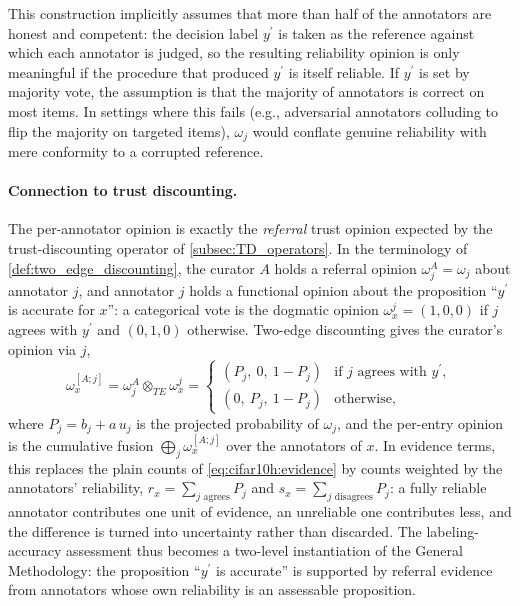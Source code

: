 This construction implicitly assumes that more than half of the annotators are honest and competent: the decision label $y^\prime$ is taken as the reference against which each annotator is judged, so the resulting reliability opinion is only meaningful if the procedure that produced $y^\prime$ is itself reliable. If $y^\prime$ is set by majority vote, the assumption is that the majority of annotators is correct on most items. In settings where this fails (e.g., adversarial annotators colluding to flip the majority on targeted items), $\omega_j$ would conflate genuine reliability with mere conformity to a corrupted reference.

\paragraph{Connection to trust discounting.}
The per-annotator opinion is exactly the \emph{referral} trust opinion expected by the trust-discounting operator of \cref{subsec:TD_operators}. In the terminology of \cref{def:two_edge_discounting}, the curator $A$ holds a referral opinion $\omega^A_j = \omega_j$ about annotator $j$, and annotator $j$ holds a functional opinion about the proposition ``$y^\prime$ is accurate for $x$'': a categorical vote is the dogmatic opinion $\omega^j_x = (1, 0, 0)$ if $j$ agrees with $y^\prime$ and $(0, 1, 0)$ otherwise. Two-edge discounting gives the curator's opinion via $j$,
\[
\omega^{[A;j]}_x = \omega^A_j \otimes_{TE} \omega^j_x =
\begin{cases}
(P_j,\ 0,\ 1 - P_j) & \text{if } j \text{ agrees with } y^\prime,\\
(0,\ P_j,\ 1 - P_j) & \text{otherwise},
\end{cases}
\]
where $P_j = b_j + a\,u_j$ is the projected probability of $\omega_j$, and the per-entry opinion is the cumulative fusion $\bigoplus_j \omega^{[A;j]}_x$ over the annotators of $x$. In evidence terms, this replaces the plain counts of \cref{eq:cifar10h:evidence} by counts weighted by the annotators' reliability, $r_x = \sum_{j \text{ agrees}} P_j$ and $s_x = \sum_{j \text{ disagrees}} P_j$: a fully reliable annotator contributes one unit of evidence, an unreliable one contributes less, and the difference is turned into uncertainty rather than discarded. The labeling-accuracy assessment thus becomes a two-level instantiation of the General Methodology: the proposition ``$y^\prime$ is accurate'' is supported by referral evidence from annotators whose own reliability is an assessable proposition.

